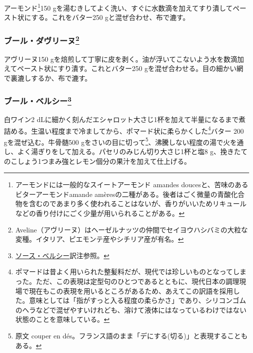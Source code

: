 \begin{recette}
アーモンド\footnote{アーモンドには一般的なスイートアーモンド amandes
  doucesと、苦味のあるビターアーモンドamande
  amèresの二種がある。後者はごく微量の青酸化合物を含むのであまり多く使われることはないが、香りがいいためリキュールなどの香り付けにごく少量が用いられることがある。}150
gを湯むきしてよく洗い、すぐに水数滴を加えてすり潰してペースト状にする。これをバター250
gと混ぜ合わせ、布で漉す。

\hypertarget{beurre-d-aveline}{%
\subsubsection[ブール・ダヴリーヌ]{\texorpdfstring{ブール・ダヴリーヌ\footnote{Aveline（アヴリーヌ）はヘーゼルナッツの仲間でセイヨウハシバミの大粒な変種。イタリア、ピエモンテ産やシチリア産が有名。}}{ブール・ダヴリーヌ}}\label{beurre-d-aveline}}



アヴリーヌ150
gを焙煎して丁寧に皮を剥く。油が浮いてこないよう水を数滴加えてペースト状にすり潰す。これとバター250
gを混ぜ合わせる。目の細かい網で裏漉しするか、布で漉す。

\hypertarget{beurre-bercy}{%
\subsubsection[ブール・ベルシー]{\texorpdfstring{ブール・ベルシー\footnote{\protect\hyperlink{sauce-bercy}{ソース・ベルシー}訳注参照。}}{ブール・ベルシー}}\label{beurre-bercy}}



白ワイン2
dLに細かく刻んだエシャロット大さじ1杯を加えて半量になるまで煮詰める。生温い程度まで冷ましてから、ポマード状に柔らかくした\footnote{ポマードは昔よく用いられた整髪料だが、現代では珍しいものとなってしまった。ただ、この表現は定型句のひとつであるとともに、現代日本の調理現場で現在もこの表現を用いるところがあるため、あえてこの訳語を採用した。意味としては「指がすっと入る程度の柔らかさ」であり、シリコンゴムのヘラなどで混ぜやすいけれども、溶けて液体にはなっているわけではない状態のことを意味している。}バター
200 gを混ぜ込む。牛骨髄500 gをさいの目に切って\footnote{原文 couper en
  dés。フランス語のまま「デにする(切る)」と表現することもある。}、沸騰しない程度の湯で火を通し、よく湯ぎりをして加える。パセリのみじん切り大さじ1杯と塩8
g、挽きたてのこしょう1つまみ強とレモン\undemi{}個分の果汁を加えて仕上げる。


\end{recette}
